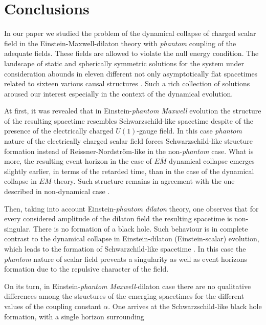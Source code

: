 \documentclass[aps,showpacs,nofootinbib,floatfix]{revtex4}
\begin{document}
\section{Conclusions}

In our paper we studied the problem of the dynamical collapse 
of charged scalar field in the Einstein-Maxwell-dilaton theory with {\it phantom} coupling of the adequate fields.
These fields are allowed to violate the null energy condition. 
The landscape of static and spherically symmetric solutions for the system under consideration abounds in 
eleven different not only asymptotically flat spacetimes related to sixteen various causal structures \cite{cle09}. 
Such a rich collection of solutions aroused our interest especially in the context of the dynamical evolution.
\par
At first, it was revealed that in
Einstein-{\it phantom Maxwell} evolution the structure of the resulting spacetime resembles Schwarzschild-like
spacetime despite of the presence of the electrically charged $U(1)$-gauge field. 
In this case {\it phantom} nature of the electrically charged scalar field forces Schwarzschild-like 
structure formation instead of Reissner-Nordstr\"{o}m-like in the non-{\it phantom} case. What is more, 
the resulting event horizon in the case of $E\overline{M}$ dynamical collapse emerges slightly earlier, in 
terms of the retarded time, than in the case of the dynamical collapse 
in $EM$-theory. Such structure remains in agreement with the one described in non-dynamical case \cite{gib96,cle09}.
\par
Then, taking into account Einstein-{\it phantom dilaton} theory, one observes that for every considered
amplitude of the dilaton field the resulting spacetime is non-singular. There is no formation of
a black hole. Such behaviour is in complete contrast
to the dynamical collapse in Einstein-dilaton (Einstein-scalar) evolution, which leads to the formation of
Schwarzchild-like spacetime \cite{ham96}. 
In this case the {\it phantom} nature of scalar field prevents a singularity 
as well as event horizons formation due to the repulsive character of the field.
\par 
On its turn, in Einstein-{\it phantom Maxwell}-dilaton case there are no qualitative differences among the structures of
the emerging spacetimes for the different values of the coupling constant $\alpha$. One arrives at the
Schwarzschild-like black hole formation, with a single horizon surrounding
\end{document}
